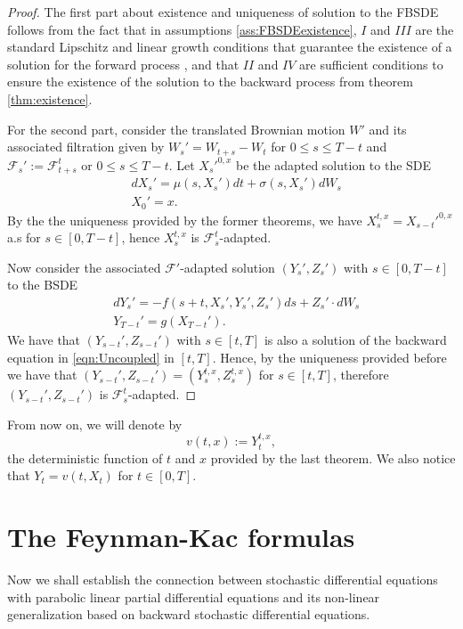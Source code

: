 \begin{proof}
	The first part about existence and uniqueness of solution to the FBSDE follows from the fact that in assumptions \ref{ass:FBSDEexistence}, $I$ and $III$ are the standard Lipschitz and linear growth conditions that guarantee the existence of a solution for the forward process \cite{mao_stochastic_2008}, and that $II$ and $IV$ are sufficient conditions to ensure the existence of the solution to the backward process from theorem \ref{thm:existence}.
	
	For the second part, consider the translated Brownian motion $W'$ and its associated filtration given by $W_s'=W_{t+s}-W_t$ for $0\leq s\leq T-t$ and $\mathcal{F}_s':=\mathcal{F}_{t+s}^t$ or $0\leq s\leq T-t$. Let $X_s'^{0,x}$ be the adapted solution to the SDE
	\begin{equation}
		\begin{split}
			&dX_s'=\mu(s,X_s')dt+\sigma(s,X_s')dW_s\\
			&X_0'=x.
		\end{split}
	\end{equation}
	By the the uniqueness provided by the former theorems, we have $X_s^{t,x}=X_{s-t}'^{0,x}$ a.s for $s\in[0,T-t]$, hence $X_s^{t,x}$ is $\mathcal{F}_{s}^{t}$-adapted.
	
	Now consider the associated $\mathcal{F}'$-adapted solution $(Y_s',Z_s')$ with $s\in[0,T-t]$ to the BSDE
	\begin{equation}
		\begin{split}
			&dY_s'=-f(s+t,X_s',Y_s',Z_s')ds+Z_s'\cdot dW_s\\
			&Y_{T-t}'=g(X_{T-t}').
		\end{split}
	\end{equation}
We have that $(Y_{s-t}',Z_{s-t}')$ with $s\in[t,T]$ is also a solution of the backward equation in \eqref{eqn:Uncoupled} in $[t,T]$. Hence, by the  uniqueness provided before we have that $(Y_{s-t}',Z_{s-t}')=(Y_{s}^{t,x},Z_{s}^{t,x})$ for $s\in[t,T]$, therefore $(Y_{s-t}',Z_{s-t}')$ is $\mathcal{F}_{s}^{t}$-adapted.
\end{proof}
From now on, we will denote by
\begin{equation}
	v(t,x):=Y_{t}^{t,x},
\end{equation}
the deterministic function of $t$ and $x$ provided by the last theorem. We also notice that $Y_t=v(t,X_t)$ for $t\in[0,T]$. 
\section{The Feynman-Kac formulas}
Now we shall establish the connection between stochastic differential equations with parabolic linear partial differential equations and its non-linear generalization based on backward stochastic differential equations. 
